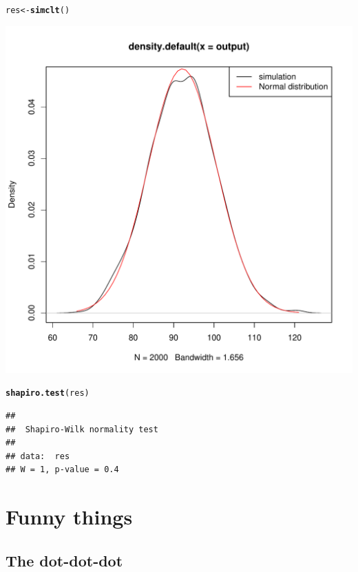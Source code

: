 \documentclass[12pt,a4paper]{scrartcl}\usepackage[]{graphicx}\usepackage[]{color}
\makeatletter
\def\maxwidth{ %
  \ifdim\Gin@nat@width>\linewidth
    \linewidth
  \else
    \Gin@nat@width
  \fi
}
\newcommand{\hlstd}[1]{\textcolor[rgb]{0.345,0.345,0.345}{#1}}%
\newcommand{\hlkwb}[1]{\textcolor[rgb]{0.69,0.353,0.396}{#1}}%
\newcommand{\hlkwd}[1]{\textcolor[rgb]{0.737,0.353,0.396}{\textbf{#1}}}%
\newenvironment{kframe}{%
 \def\at@end@of@kframe{}%
 \ifinner\ifhmode%
  \def\at@end@of@kframe{\end{minipage}}%
  \begin{minipage}{\columnwidth}%
 \fi\fi%
 \def\FrameCommand##1{\hskip\@totalleftmargin \hskip-\fboxsep
 \colorbox{shadecolor}{##1}\hskip-\fboxsep
     \hskip-\linewidth \hskip-\@totalleftmargin \hskip\columnwidth}%
 \MakeFramed {\advance\hsize-\width
   \@totalleftmargin\z@ \linewidth\hsize
   \@setminipage}}%
 {\par\unskip\endMakeFramed%
 \at@end@of@kframe}
\newenvironment{knitrout}{}{} %
\makeatother
\begin{document}
\begin{Answer}
\begin{knitrout}
\begin{kframe}
\begin{alltt}
\hlstd{res} \hlkwb{<-} \hlkwd{simclt}\hlstd{()}
\end{alltt}
\end{kframe}
\includegraphics[width=\maxwidth]{figure/unnamed-chunk-7-1} 
\begin{kframe}\begin{alltt}
\hlkwd{shapiro.test}\hlstd{(res)}
\end{alltt}
\begin{verbatim}
## 
## 	Shapiro-Wilk normality test
## 
## data:  res
## W = 1, p-value = 0.4
\end{verbatim}
\end{kframe}
\end{knitrout}
\end{Answer}

\section{Funny things}


\subsection{The dot-dot-dot}
\end{document}
